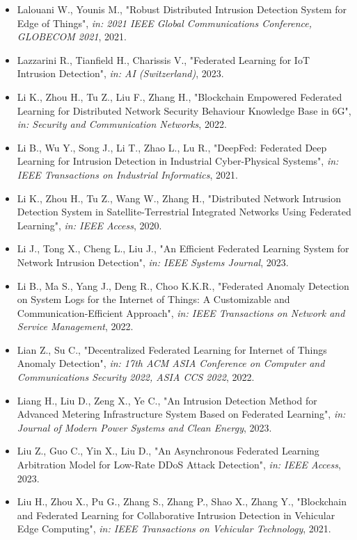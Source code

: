 \begin{itemize}
  \item Lalouani W., Younis M., "Robust Distributed Intrusion Detection System for Edge of Things", \textit{in: 2021 IEEE Global Communications Conference, GLOBECOM 2021}, 2021.
  \item Lazzarini R., Tianfield H., Charissis V., "Federated Learning for IoT Intrusion Detection", \textit{in: AI (Switzerland)}, 2023.
  \item Li K., Zhou H., Tu Z., Liu F., Zhang H., "Blockchain Empowered Federated Learning for Distributed Network Security Behaviour Knowledge Base in 6G", \textit{in: Security and Communication Networks}, 2022.
  \item Li B., Wu Y., Song J., Li T., Zhao L., Lu R., "DeepFed: Federated Deep Learning for Intrusion Detection in Industrial Cyber-Physical Systems", \textit{in: IEEE Transactions on Industrial Informatics}, 2021.
  \item Li K., Zhou H., Tu Z., Wang W., Zhang H., "Distributed Network Intrusion Detection System in Satellite-Terrestrial Integrated Networks Using Federated Learning", \textit{in: IEEE Access}, 2020.
  \item Li J., Tong X., Cheng L., Liu J., "An Efficient Federated Learning System for Network Intrusion Detection", \textit{in: IEEE Systems Journal}, 2023.
  \item Li B., Ma S., Yang J., Deng R., Choo K.K.R., "Federated Anomaly Detection on System Logs for the Internet of Things: A Customizable and Communication-Efficient Approach", \textit{in: IEEE Transactions on Network and Service Management}, 2022.
  \item Lian Z., Su C., "Decentralized Federated Learning for Internet of Things Anomaly Detection", \textit{in: 17th ACM ASIA Conference on Computer and Communications Security 2022, ASIA CCS 2022}, 2022.
  \item Liang H., Liu D., Zeng X., Ye C., "An Intrusion Detection Method for Advanced Metering Infrastructure System Based on Federated Learning", \textit{in: Journal of Modern Power Systems and Clean Energy}, 2023.
  \item Liu Z., Guo C., Yin X., Liu D., "An Asynchronous Federated Learning Arbitration Model for Low-Rate DDoS Attack Detection", \textit{in: IEEE Access}, 2023.
  \item Liu H., Zhou X., Pu G., Zhang S., Zhang P., Shao X., Zhang Y., "Blockchain and Federated Learning for Collaborative Intrusion Detection in Vehicular Edge Computing", \textit{in: IEEE Transactions on Vehicular Technology}, 2021.

\end{itemize}
